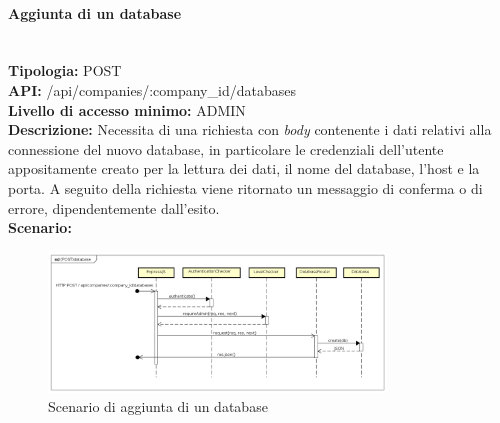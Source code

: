 \newpage
\paragraph{Aggiunta di un database}\mbox{}\\ 
\textbf{Tipologia:} POST \\
\textbf{API:} /api/companies/:company\_id/databases \\
\textbf{Livello di accesso minimo:} ADMIN \\
\textbf{Descrizione:} Necessita di una richiesta con \textit{body} contenente i dati relativi alla connessione del nuovo database, in particolare le credenziali dell'utente appositamente creato per la lettura dei dati, il nome del database, l'host e la porta. A seguito della richiesta viene ritornato un messaggio di conferma o di errore, dipendentemente dall'esito. \\
\textbf{Scenario:}
\begin{figure}[H]
\centering
\includegraphics[width=0.8\textwidth]{res/sections/backend/sequence/(POST)database.png}
\caption{Scenario di aggiunta di un database}
\end{figure}

\newpage
